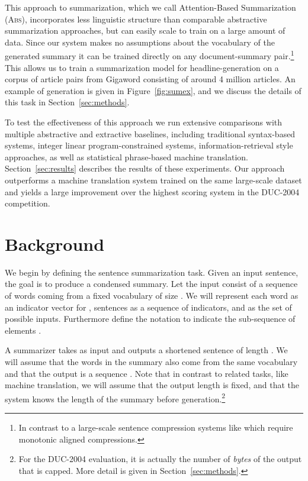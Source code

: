 \documentclass[11pt,a4paper]{article}
\begin{document}
This approach to summarization, which we call
Attention-Based Summarization (\textsc{Abs}), incorporates less linguistic structure than
comparable abstractive summarization approaches, but can easily scale to train on a
large amount of data. Since our system makes no assumptions about the
vocabulary of the generated summary it can be trained directly on any
document-summary pair.\footnote{In contrast to a large-scale sentence
compression systems like  which
require monotonic aligned compressions.} This allows us to train a
summarization model for headline-generation on a corpus of article
pairs from Gigaword \cite{graff2003english} consisting of around 4
million articles. An example of generation is given in Figure~\ref{fig:sumex}, and we discuss the details of this task in Section~\ref{sec:methods}.

To test the effectiveness of this approach we run extensive
comparisons with multiple abstractive and extractive baselines,
including traditional syntax-based systems, integer linear
program-constrained systems, information-retrieval style approaches,
as well as statistical phrase-based machine
translation. Section~\ref{sec:results} describes the results of these
experiments. Our approach outperforms a machine translation system
trained on the same large-scale dataset and yields a large
improvement over the highest scoring system in the DUC-2004
competition. 

\section{Background}
\label{sec:background}

We begin by defining the sentence summarization
task. Given
an input sentence, the goal is to produce a condensed summary. Let the
input consist of a sequence of  words 
coming from a fixed vocabulary  of size  . We
will represent each word as an indicator vector  for , sentences as a sequence of
indicators, and  as the set of possible inputs.  Furthermore define the notation  to
indicate the sub-sequence of elements .


A summarizer takes  as input and outputs a shortened sentence  of length . We will assume that the words in
the summary also come from the same vocabulary  and that the output is a sequence
. Note that in contrast to related tasks, like machine translation, we will  assume
that the output length  is fixed, and that the system knows the length of the
summary before generation.\footnote{For the DUC-2004 evaluation, it is actually the number of \textit{bytes} of the output that is capped. More detail is given in Section~\ref{sec:methods}.}
\end{document}
